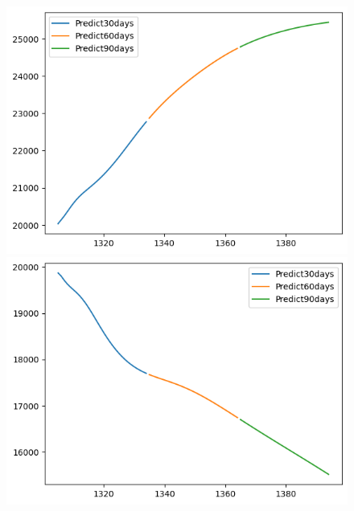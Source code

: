 \begin{figure}[H]
\begin{minipage}{0.15\textwidth}
    \includegraphics[width=1\textwidth]{resources/chapter-5/newdata1/predicted/EIB_ LSTM_7-3_30days.png}
    \end{minipage}
    \hfill
    \begin{minipage}{0.15\textwidth}
    \centering
    \includegraphics[width=1\textwidth]{resources/chapter-5/newdata1/predicted/EIB_ LSTM_8-2_30days.png}
    \end{minipage}
    \hfill
        \begin{minipage}{0.15\textwidth}
    \centering

\end{minipage}
\end{figure}
